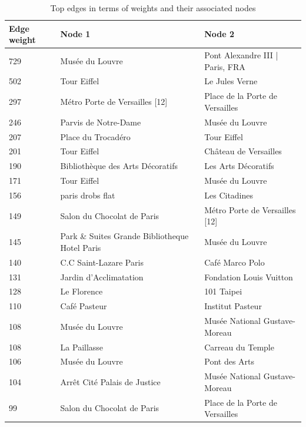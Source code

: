 \begin{table}
  \centering
  \begin{tabularx}{\textwidth}{| X | X | X |}
    \hline
    \textbf{Edge weight} & \textbf{Node 1} & \textbf{Node 2} \\ \hline
    729 & Musée du Louvre & Pont Alexandre III | Paris, FRA \\ \hline
    502 & Tour Eiffel & Le Jules Verne \\ \hline
    297 & Métro Porte de Versailles [12] & Place de la Porte de Versailles \\ \hline
    246 & Parvis de Notre-Dame & Musée du Louvre \\ \hline
    207 & Place du Trocadéro & Tour Eiffel \\ \hline
    201 & Tour Eiffel & Château de Versailles \\ \hline
    190 & Bibliothèque des Arts Décoratifs & Les Arts Décoratifs \\ \hline
    171 & Tour Eiffel & Musée du Louvre \\ \hline
    156 & paris drobs flat & Les Citadines \\ \hline
    149 & Salon du Chocolat de Paris & Métro Porte de Versailles [12] \\ \hline
    145 & Park \& Suites Grande Bibliotheque Hotel Paris & Musée du Louvre \\ \hline
    140 & C.C Saint-Lazare Paris & Café Marco Polo \\ \hline
    131 & Jardin d'Acclimatation & Fondation Louis Vuitton \\ \hline
    128 & Le Florence & 101 Taipei \\ \hline
    110 & Café Pasteur & Institut Pasteur \\ \hline
    108 & Musée du Louvre & Musée National Gustave-Moreau \\ \hline
    108 & La Paillasse & Carreau du Temple \\ \hline
    106 & Musée du Louvre & Pont des Arts \\ \hline
    104 & Arrêt Cité Palais de Justice & Musée National Gustave-Moreau \\ \hline
    99 & Salon du Chocolat de Paris & Place de la Porte de Versailles \\ \hline
    \hline
  \end{tabularx}
  \caption{Top edges in terms of weights and their associated nodes}
  \label{table:edges}
\end{table}

